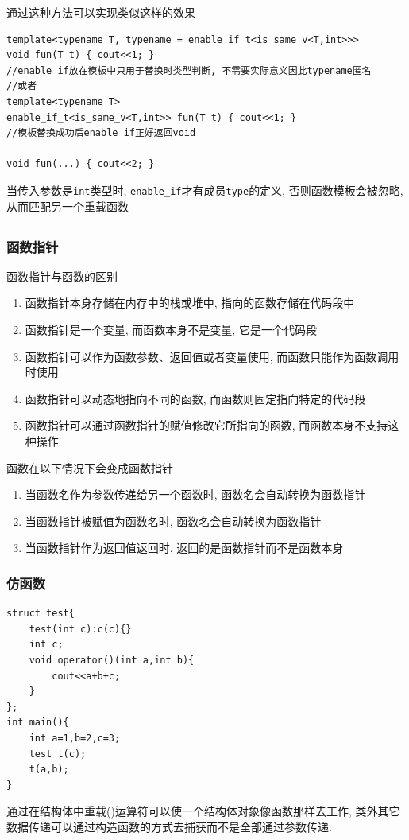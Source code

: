 通过这种方法可以实现类似这样的效果
\begin{lstlisting}
template<typename T, typename = enable_if_t<is_same_v<T,int>>>
void fun(T t) { cout<<1; }
//enable_if放在模板中只用于替换时类型判断, 不需要实际意义因此typename匿名
//或者
template<typename T>
enable_if_t<is_same_v<T,int>> fun(T t) { cout<<1; }
//模板替换成功后enable_if正好返回void

void fun(...) { cout<<2; }
\end{lstlisting}
当传入参数是{\tt int}类型时, {\tt enable\_if}才有成员{\tt type}的定义, 否则函数模板会被忽略, 从而匹配另一个重载函数
\subsection{\color{purple}{函数}}
\subsubsection{函数指针}
函数指针与函数的区别
\begin{enumerate}
	\item 函数指针本身存储在内存中的栈或堆中, 指向的函数存储在代码段中
	\item 函数指针是一个变量, 而函数本身不是变量, 它是一个代码段
	\item 函数指针可以作为函数参数、返回值或者变量使用, 而函数只能作为函数调用时使用
	\item 函数指针可以动态地指向不同的函数, 而函数则固定指向特定的代码段
	\item 函数指针可以通过函数指针的赋值修改它所指向的函数, 而函数本身不支持这种操作
\end{enumerate}

函数在以下情况下会变成函数指针
\begin{enumerate}
	\item 当函数名作为参数传递给另一个函数时, 函数名会自动转换为函数指针
	\item 当函数指针被赋值为函数名时, 函数名会自动转换为函数指针
	\item 当函数指针作为返回值返回时, 返回的是函数指针而不是函数本身
\end{enumerate}

\subsubsection{仿函数}
\begin{paracol}{2}
	\begin{leftcolumn}
		\begin{lstlisting}
struct test{
	test(int c):c(c){}
	int c;
	void operator()(int a,int b){
		cout<<a+b+c;
	}
};
int main(){
	int a=1,b=2,c=3;
	test t(c);
	t(a,b);
}
			\end{lstlisting}
	\end{leftcolumn}
	\begin{rightcolumn}
		通过在结构体中重载()运算符可以使一个结构体对象像函数那样去工作, 
			类外其它数据传递可以通过构造函数的方式去捕获而不是全部通过参数传递.
	\end{rightcolumn}
\end{paracol}

